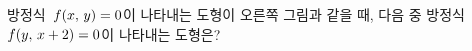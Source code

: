 \noindent\begin{minipage}[t]{0.58\linewidth}\vspace{0pt}\raggedright 방정식~$f(x,\mkern3mu y)=0$이 나타내는 도형이 오른쪽 그림과 같을 때, 다음 중 방정식~$f(y,\mkern3mu x+2)=0$이 나타내는 도형은?\end{minipage}\hfill\begin{minipage}[t]{0.4\linewidth}\vspace{0pt}\centering \resizebox{\ifdim\width>\linewidth\linewidth\else\width\fi}{!}{}\end{minipage}\par
\begin{choicesii}{}{}{}{}{}\end{choicesii}
